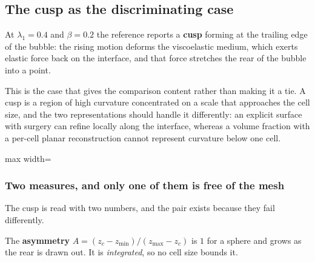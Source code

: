 \subsection{The cusp as the discriminating case}

At $\lambda_1 = 0.4$ and $\beta = 0.2$ the reference reports a \textbf{cusp}
forming at the trailing edge of the bubble: the rising motion deforms the
viscoelastic medium, which exerts elastic force back on the interface, and that
force stretches the rear of the bubble into a point.

This is the case that gives the comparison content rather than making it a tie.
A cusp is a region of high curvature concentrated on a scale that approaches the
cell size, and the two representations should handle it differently: an explicit
surface with surgery can refine locally along the interface, whereas a volume
fraction with a per-cell planar reconstruction cannot represent curvature below
one cell.


\begin{table}[htbp]
\centering
\caption{The pair at $t=4$, $50{\times}50{\times}150$, same instrument for both.}
\label{tab:ftn50}
\small
\begin{adjustbox}{max width=\linewidth}
\end{adjustbox}
\end{table}

\subsubsection{Two measures, and only one of them is free of the mesh}

The cusp is read with two numbers, and the pair exists because they fail
differently.

The \textbf{asymmetry} $A = (z_c - z_{\min})/(z_{\max} - z_c)$ is $1$ for a
sphere and grows as the rear is drawn out. It is \emph{integrated}, so no cell
size bounds it.

